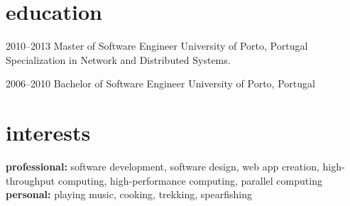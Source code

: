 \documentclass[]{friggeri-cv} %
\begin{document}

\section{education}

\begin{entrylist}


\entry
{2010--2013}
{Master {\normalfont of Software Engineer}}
{University of Porto, Portugal}
{Specialization in Network and Distributed Systems.}


\entry
{2006--2010}
{Bachelor {\normalfont of Software Engineer}}
{University of Porto, Portugal}
{}


\end{entrylist}


\section{interests}

\textbf{professional:} software development, software design, web app creation, high-throughput computing,  high-performance computing, parallel computing \textbf{personal:} playing music, cooking, trekking, spearfishing
\end{document}
